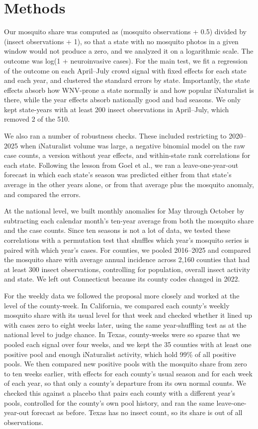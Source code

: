 \documentclass[11pt]{article}
\begin{document}
\section{Methods}
Our mosquito share was computed as (mosquito observations + 0.5) divided by (insect observations + 1), so that a state with no mosquito photos in a given window would not produce a zero, and we analyzed it on a logarithmic scale. The outcome was log(1 + neuroinvasive cases). For the main test, we fit a regression of the outcome on each April--July crowd signal with fixed effects for each state and each year, and clustered the standard errors by state. Importantly, the state effects absorb how WNV-prone a state normally is and how popular iNaturalist is there, while the year effects absorb nationally good and bad seasons. We only kept state-years with at least 200 insect observations in April--July, which removed 2 of the 510.

We also ran a number of robustness checks. These included restricting to 2020--2025 when iNaturalist volume was large, a negative binomial model on the raw case counts, a version without year effects, and within-state rank correlations for each state. Following the lesson from Goel et al., we ran a leave-one-year-out forecast in which each state's season was predicted either from that state's average in the other years alone, or from that average plus the mosquito anomaly, and compared the errors.

At the national level, we built monthly anomalies for May through October by subtracting each calendar month's ten-year average from both the mosquito share and the case counts. Since ten seasons is not a lot of data, we tested these correlations with a permutation test that shuffles which year's mosquito series is paired with which year's cases. For counties, we pooled 2016--2025 and compared the mosquito share with average annual incidence across 2,160 counties that had at least 300 insect observations, controlling for population, overall insect activity and state. We left out Connecticut because its county codes changed in 2022.

For the weekly data we followed the proposal more closely and worked at the level of the county-week. In California, we compared each county's weekly mosquito share with its usual level for that week and checked whether it lined up with cases zero to eight weeks later, using the same year-shuffling test as at the national level to judge chance. In Texas, county-weeks were so sparse that we pooled each signal over four weeks, and we kept the 35 counties with at least one positive pool and enough iNaturalist activity, which hold 99\% of all positive pools. We then compared new positive pools with the mosquito share from zero to ten weeks earlier, with effects for each county's usual season and for each week of each year, so that only a county's departure from its own normal counts. We checked this against a placebo that pairs each county with a different year's pools, controlled for the county's own pool history, and ran the same leave-one-year-out forecast as before. Texas has no insect count, so its share is out of all observations.
\end{document}

